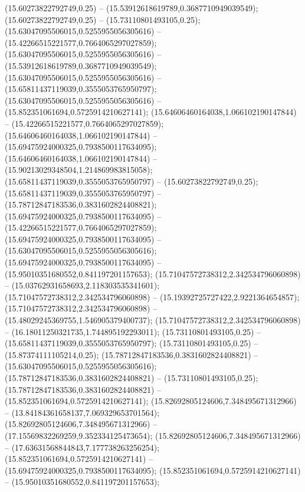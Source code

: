  (15.60273822792749,0.25) -- (15.53912618619789,0.3687710949039549);
 (15.60273822792749,0.25) -- (15.73110801493105,0.25);
 (15.63047095506015,0.5255955056305616) -- (15.42266515221577,0.7664065297027859);
 (15.63047095506015,0.5255955056305616) -- (15.53912618619789,0.3687710949039549);
 (15.63047095506015,0.5255955056305616) -- (15.65811437119039,0.3555053765950797);
 (15.63047095506015,0.5255955056305616) -- (15.852351061694,0.5725914210627141);
 (15.64606460164038,1.066102190147844) -- (15.42266515221577,0.7664065297027859);
 (15.64606460164038,1.066102190147844) -- (15.69475924000325,0.7938500117634095);
 (15.64606460164038,1.066102190147844) -- (15.90213029348504,1.214869983815058);
 (15.65811437119039,0.3555053765950797) -- (15.60273822792749,0.25);
 (15.65811437119039,0.3555053765950797) -- (15.78712847183536,0.3831602824408821);
 (15.69475924000325,0.7938500117634095) -- (15.42266515221577,0.7664065297027859);
 (15.69475924000325,0.7938500117634095) -- (15.63047095506015,0.5255955056305616);
 (15.69475924000325,0.7938500117634095) -- (15.95010351680552,0.841197201157653);
 (15.71047572738312,2.342534796060898) -- (15.03762931658693,2.118303535341601);
 (15.71047572738312,2.342534796060898) -- (15.19392725727422,2.9221364654857);
 (15.71047572738312,2.342534796060898) -- (15.48029245369755,1.546905379400737);
 (15.71047572738312,2.342534796060898) -- (16.18011250321735,1.744895192293011);
 (15.73110801493105,0.25) -- (15.65811437119039,0.3555053765950797);
 (15.73110801493105,0.25) -- (15.87374111105214,0.25);
 (15.78712847183536,0.3831602824408821) -- (15.63047095506015,0.5255955056305616);
 (15.78712847183536,0.3831602824408821) -- (15.73110801493105,0.25);
 (15.78712847183536,0.3831602824408821) -- (15.852351061694,0.5725914210627141);
 (15.82692805124606,7.348495671312966) -- (13.84184361658137,7.069329653701564);
 (15.82692805124606,7.348495671312966) -- (17.15569832269259,9.352334125473654);
 (15.82692805124606,7.348495671312966) -- (17.63631568844843,7.177738263256254);
 (15.852351061694,0.5725914210627141) -- (15.69475924000325,0.7938500117634095);
 (15.852351061694,0.5725914210627141) -- (15.95010351680552,0.841197201157653);
